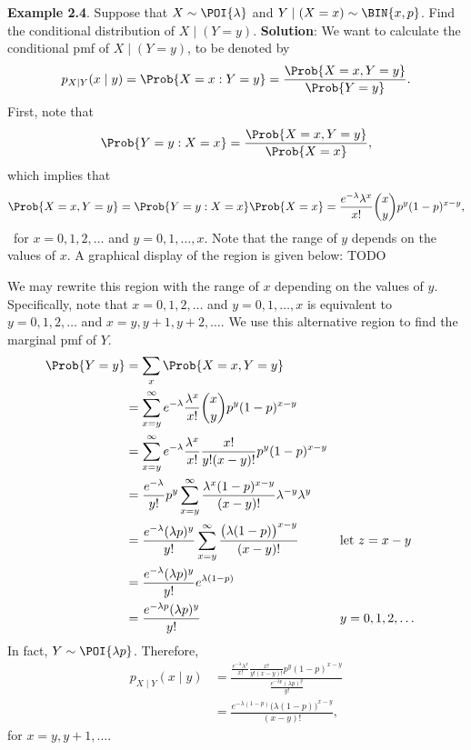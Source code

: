 \begin{Example}{}
    \textbf{Example 2.4}. Suppose that $ X \sim \POI{\lambda} $ and $ Y\mid(X=x)\sim \BIN{x,p} $. Find the conditional distribution of $ X\mid(Y=y) $.
    \tcblower{}
    \textbf{Solution}: We want to calculate the conditional pmf of $ X\mid(Y=y) $, to be denoted by
    \[ p_{X\mid Y}(x\mid y)=\Prob{X=x\given Y=y}=\frac{\Prob{X=x,Y=y}}{\Prob{Y=y}}. \]
    First, note that
    \[ \Prob{Y=y\given X=x}=\frac{\Prob{X=x,Y=y}}{\Prob{X=x}}, \]
    which implies that
    \[ \Prob{X=x,Y=y}=\Prob{Y=y\given X=x}\Prob{X=x}=\frac{e^{-\lambda}\lambda^x}{x!}\binom{x}{y}p^y(1-p)^{x-y},  \]\
    for $x=0,1,2,\ldots$ and $y=0,1,\ldots,x$.
    Note that the range of $ y $ depends on the values of $ x $. A graphical display of the region is given below: TODO

    We may rewrite this region with the range of $ x $ depending on the values of $ y $. Specifically, note that $ x=0,1,2,\ldots $ and $ y=0,1,\ldots,x $
    is equivalent to $ y=0,1,2,\ldots $ and $ x=y,y+1,y+2,\ldots $. We use this alternative region to find the marginal pmf of $ Y $.
    \begin{align*}
        \Prob{Y=y}
         & =\sum_x\Prob{X=x,Y=y}                                                                                                                \\
         & =\sum_{x=y}^{\infty} e^{-\lambda}\frac{\lambda^x}{x!} \binom{x}{y}p^y(1-p)^{x-y}                                                     \\
         & =\sum_{x=y}^{\infty} e^{-\lambda}\frac{\lambda^x}{x!} \frac{x!}{y!(x-y)!} p^y(1-p)^{x-y}                                             \\
         & =\frac{e^{-\lambda}}{y!} p^y \sum_{x=y}^\infty \frac{\lambda^x (1-p)^{x-y}}{(x-y)!}\lambda^{-y}\lambda^{y}                           \\
         & =\frac{e^{-\lambda}(\lambda p)^y}{y!}\sum_{x=y}^\infty \frac{\bigl(\lambda(1-p)\bigr)^{x-y}}{(x-y)!}       &  & \text{let $ z=x-y $} \\
         & =\frac{e^{-\lambda}(\lambda p)^y}{y!}e^{\lambda(1-p)}                                                                                \\
         & =\frac{e^{-\lambda p}(\lambda p)^y}{y!}                                                                    &  & y=0,1,2,\ldots
    \end{align*}
    In fact, $ Y \sim \POI{\lambda p} $. Therefore,
    \begin{align*}
        p_{X\mid Y}(x\mid y)
         & =\frac{ \frac{e^{-\lambda}\lambda^x}{x!} \frac{x!}{y!(x-y)!} p^y(1-p)^{x-y} }{\frac{e^{-\lambda p}(\lambda p)^y}{y!}} \\
         & =\frac{e^{-\lambda(1-p)}\bigl(\lambda(1-p)\bigr)^{x-y}}{(x-y)!},
    \end{align*}
    for $ x=y,y+1,\ldots $.
\end{Example}
